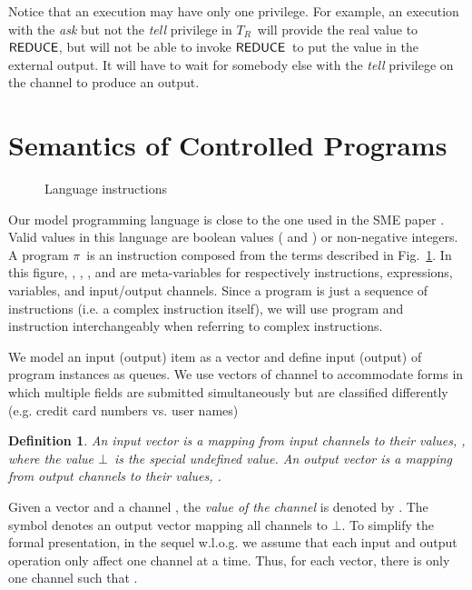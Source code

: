 \documentclass[10pt,a4paper,oneside]{article}
\newtheorem{definition}{Definition}[section]
\def\TPV{\ensuremath{T_{R}}}
\def\NIL{\ensuremath{\bot}}
\def\sanserif#1{\ensuremath{\sf #1}}
\def\REDUCE{\ensuremath{\sanserif{REDUCE}}}
\def\Prog{\ensuremath{\pi}}
\begin{document}
Notice that an execution may have only one privilege. For example, an execution with the \emph{ask} but not the \emph{tell} privilege in \TPV\ will provide the real value to \REDUCE, but will not be able to invoke \REDUCE\ to put the value in the external output. It will have to wait for somebody else with the \emph{tell} privilege on the channel to produce an output.




\section{Semantics of Controlled Programs}\label{sec:formalization:proram}
\begin{figure}
\centering

\caption{Language instructions}
\label{fig:Comm:Standard}
\end{figure}


Our model programming language is close to the one used in the SME paper \cite{Devr-Pies-10-IEEESP}. Valid values in this language are boolean values ( and ) or non-negative integers. A program \Prog\ is an instruction composed from the terms described in Fig.~\ref{fig:Comm:Standard}. In this figure, , , , and  are meta-variables for respectively instructions, expressions, variables, and input/output channels. Since a program is just a sequence of instructions (i.e. a complex instruction itself), we will use program and instruction interchangeably when referring to complex instructions.

We model an input (output) item as a vector and define input (output) of program instances as queues. We use vectors of channel to accommodate forms in which multiple fields are submitted simultaneously but are classified differently (e.g. credit card numbers vs. user names)

\begin{definition}\label{def:vector}
An \emph{input vector}  is a mapping from input channels to their values, , where the value \NIL\ is the special undefined value. An \emph{output vector}  is a mapping from output channels to their values, .
\end{definition}


Given a vector  and a channel , the \emph{value of the channel} is denoted by . The symbol  denotes an output vector mapping all channels to \NIL. To simplify the formal presentation, in the sequel w.l.o.g. we assume that each input and output operation only affect one channel at a time. Thus, for each vector, there is only one channel  such that .
\end{document}
